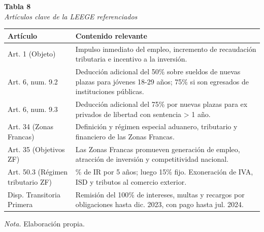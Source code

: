 \documentclass[12pt,spanish]{article}
\newcounter{none}
\begin{document}
\textbf{Tabla 8}\\
\emph{Artículos clave de la LEEGE referenciados}

{\def\LTcaptype{none} %
\begin{longtable}[]{@{}
  >{\raggedright\arraybackslash}p{}
  >{\raggedright\arraybackslash}p{}@{}}
\toprule\noalign{}
\begin{minipage}[b]{\linewidth}\raggedright
Artículo
\end{minipage} & \begin{minipage}[b]{\linewidth}\raggedright
Contenido relevante
\end{minipage} \\
\midrule\noalign{}
\endhead
\bottomrule\noalign{}
\endlastfoot
Art. 1 (Objeto) & Impulso inmediato del empleo, incremento de
recaudación tributaria e incentivo a la inversión. \\
Art. 6, num. 9.2 & Deducción adicional del 50\% sobre sueldos de nuevas
plazas para jóvenes 18-29 años; 75\% si son egresados de instituciones
públicas. \\
Art. 6, num. 9.3 & Deducción adicional del 75\% por nuevas plazas para
ex privados de libertad con sentencia \textgreater{} 1 año. \\
Art. 34 (Zonas Francas) & Definición y régimen especial aduanero,
tributario y financiero de las Zonas Francas. \\
Art. 35 (Objetivos ZF) & Las Zonas Francas promueven generación de
empleo, atracción de inversión y competitividad nacional. \\
Art. 50.3 (Régimen tributario ZF) & 0\% de IR por 5 años; luego 15\%
fijo. Exoneración de IVA, ISD y tributos al comercio exterior. \\
Disp. Transitoria Primera & Remisión del 100\% de intereses, multas y
recargos por obligaciones hasta dic. 2023, con pago hasta jul. 2024. \\
\end{longtable}
}

\emph{Nota.} Elaboración propia.
\end{document}
